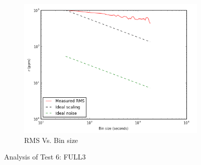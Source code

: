 \documentclass{aastex6}
\begin{document}
\begin{figure}[H]
    \begin{subfigure}{3}
        \includegraphics[scale=0.6]{rms_test6}
        \caption{RMS Vs. Bin size}
    \end{subfigure}
    \caption{Analysis of Test 6: FULL3}
\end{figure}
\end{document}
